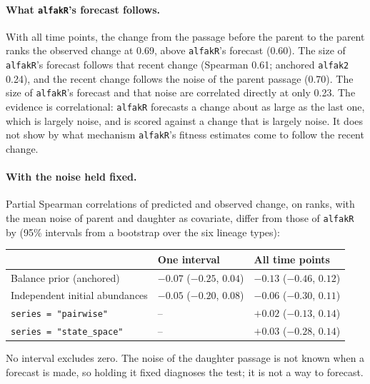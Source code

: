 \documentclass[11pt]{article}
\begin{document}
\paragraph{What \texttt{alfakR}'s forecast follows.} With all time points, the
change from the passage before the parent to the parent ranks the observed
change at 0.69, above \texttt{alfakR}'s forecast (0.60). The size of
\texttt{alfakR}'s forecast follows that recent change (Spearman 0.61; anchored
\texttt{alfak2} 0.24), and the recent change follows the noise of the parent
passage (0.70). The size of \texttt{alfakR}'s forecast and that noise are
correlated directly at only 0.23. The evidence is correlational:
\texttt{alfakR} forecasts a change about as large as the last one, which is
largely noise, and is scored against a change that is largely noise. It does
not show by what mechanism \texttt{alfakR}'s fitness estimates come to follow
the recent change.

\paragraph{With the noise held fixed.} Partial Spearman correlations of
predicted and observed change, on ranks, with the mean noise of parent and
daughter as covariate, differ from those of \texttt{alfakR} by (95\%
intervals from a bootstrap over the six lineage types):

\begin{center}
\begin{tabular}{L{0.42\textwidth}L{0.22\textwidth}L{0.22\textwidth}}
\toprule
 & One interval & All time points \\
\midrule
Balance prior (anchored) & $-0.07$ ($-0.25$, $0.04$) & $-0.13$ ($-0.46$, $0.12$) \\
Independent initial abundances & $-0.05$ ($-0.20$, $0.08$) & $-0.06$ ($-0.30$, $0.11$) \\
\texttt{series = "pairwise"} & -- & $+0.02$ ($-0.13$, $0.14$) \\
\texttt{series = "state\_space"} & -- & $+0.03$ ($-0.28$, $0.14$) \\
\bottomrule
\end{tabular}
\end{center}

No interval excludes zero. The noise of the daughter passage is not known when
a forecast is made, so holding it fixed diagnoses the test; it is not a way to
forecast.
\end{document}
